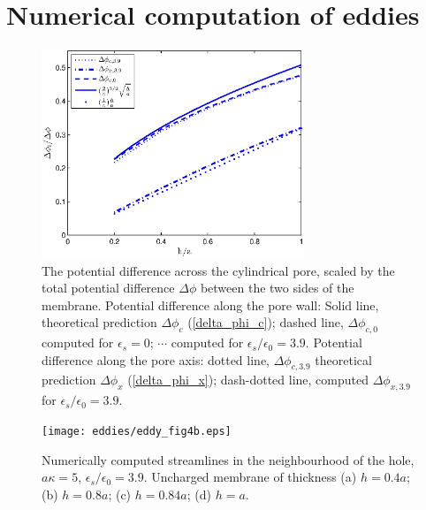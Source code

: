\section{Numerical computation of eddies \label{numerical_comp}}


\begin{figure}[h]
\centering
\includegraphics[width=0.7\textwidth,clip=true]{eddies/DeltaV_At_Corner_and_Axis2.eps}
\caption{The potential difference across the cylindrical pore, scaled by the
total potential difference $\Delta\phi$ between the two sides of the
membrane. Potential difference along the pore wall:
Solid line, theoretical prediction
$\Delta\phi_c$
(\ref{delta_phi_c});
dashed line, $\Delta\phi_{c,0}$ computed for $\epsilon_s=0$;
$\cdots$ 
computed for $\epsilon_s/\epsilon_0=3.9$.
Potential difference along the pore axis:
dotted line, $\Delta\phi_{c,3.9}$ 
theoretical prediction $\Delta\phi_x$ (\ref{delta_phi_x});
dash-dotted line, computed $\Delta\phi_{x,3.9}$ for $\epsilon_s/\epsilon_0=3.9$.
\label{fig:DeltaV}}
\end{figure}


\begin{figure}[h]
\centering
\texttt{[image: eddies/eddy\_fig4b.eps]}
\caption{Numerically computed streamlines in the neighbourhood of the hole,
$a\kappa=5$, $\epsilon_s/\epsilon_0=3.9$. Uncharged membrane of thickness
(a) $h=0.4a$;
(b) $h=0.8a$;
(c) $h=0.84a$;
(d) $h=a$.
\label{fig:eddies}}
\end{figure}

